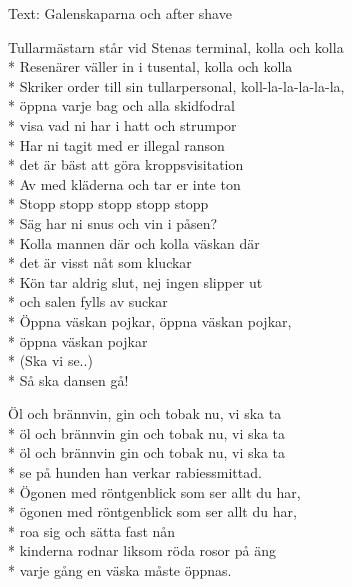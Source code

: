 \begin{SongText}[Tullarmästarn]
\begin{SongInfo}
    Text: Galenskaparna och after shave
\end{SongInfo}
\begin{SongVerse}
Tullarmästarn står vid Stenas terminal, kolla och kolla\\*%
Resenärer väller in i tusental, kolla och kolla\\*%
Skriker order till sin tullarpersonal, koll-la-la-la-la-la,\\*%
öppna varje bag och alla skidfodral\\*%
visa vad ni har i hatt och strumpor\\*%
Har ni tagit med er illegal ranson\\*%
det är bäst att göra kroppsvisitation\\*%
Av med kläderna och tar er inte ton\\*%
Stopp stopp stopp stopp stopp\\*%
Säg har ni snus och vin i påsen?\\*%
Kolla mannen där och kolla väskan där\\*%
det är visst nåt som kluckar\\*%
Kön tar aldrig slut, nej ingen slipper ut\\*%
och salen fylls av suckar\\*%
Öppna väskan pojkar, öppna väskan pojkar,\\*%
öppna väskan pojkar\\*%
(Ska vi se..)\\*%
Så ska dansen gå!
\end{SongVerse}
\begin{SongVerse}
Öl och brännvin, gin och tobak nu, vi ska ta\\*%
öl och brännvin gin och tobak nu, vi ska ta\\*%
öl och brännvin gin och tobak nu, vi ska ta\\*%
se på hunden han verkar rabiessmittad.\\*%
Ögonen med röntgenblick som ser allt du har,\\*%
ögonen med röntgenblick som ser allt du har,\\*%
roa sig och sätta fast nån\\*%
kinderna rodnar liksom röda rosor på äng\\*%
varje gång en väska måste öppnas.
\end{SongVerse}
\begin{SongVerse}

\end{SongVerse}
\end{SongText}
